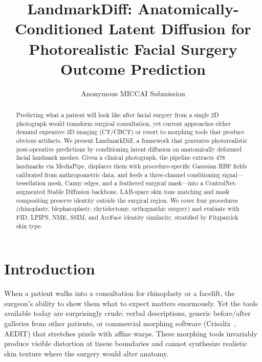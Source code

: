 \documentclass[runningheads]{llncs}
\newcommand{\method}{LandmarkDiff}
\begin{document}
\title{\method{}: Anatomically-Conditioned Latent Diffusion for\\Photorealistic Facial Surgery Outcome Prediction}

\author{Anonymous MICCAI Submission}

\maketitle

\begin{abstract}
Predicting what a patient will look like after facial surgery from a
single 2D photograph would transform surgical consultation, yet current
approaches either demand expensive 3D imaging (CT/CBCT) or resort to
morphing tools that produce obvious artifacts.  We present \method{}, a
framework that generates photorealistic post-operative predictions by
conditioning latent diffusion on anatomically deformed facial landmark
meshes.  Given a clinical photograph, the pipeline extracts 478 landmarks
via MediaPipe, displaces them with procedure-specific Gaussian RBF fields
calibrated from anthropometric data, and feeds a three-channel conditioning
signal---tessellation mesh, Canny edges, and a feathered surgical mask---into
a ControlNet-augmented Stable Diffusion backbone.  LAB-space skin tone
matching and mask compositing preserve identity outside the surgical region.
We cover four procedures (rhinoplasty, blepharoplasty, rhytidectomy,
orthognathic surgery) and evaluate with FID, LPIPS, NME, SSIM, and ArcFace
identity similarity, stratified by Fitzpatrick skin type.
\end{abstract}

\section{Introduction}
\label{sec:intro}

When a patient walks into a consultation for rhinoplasty or a facelift,
the surgeon's ability to show them what to expect matters enormously.
Yet the tools available today are surprisingly crude: verbal descriptions,
generic before/after galleries from other patients, or commercial morphing
software (Crisalix~\cite{crisalix}, AEDIT) that stretches pixels with
affine warps.  These morphing tools invariably produce visible distortion
at tissue boundaries and cannot synthesize realistic skin texture where
the surgery would alter anatomy.
\end{document}
